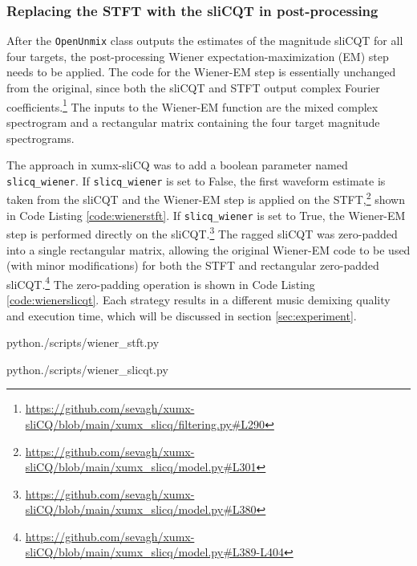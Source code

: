 \documentclass[report.tex]{subfiles}
\begin{document}
\subsubsection{Replacing the STFT with the sliCQT in post-processing}
\label{sec:replacestftwiener}

After the \Verb#OpenUnmix# class outputs the estimates of the magnitude sliCQT for all four targets, the post-processing Wiener expectation-maximization (EM) step needs to be applied. The code for the Wiener-EM step is essentially unchanged from the original, since both the sliCQT and STFT output complex Fourier coefficients.\footnote{\url{https://github.com/sevagh/xumx-sliCQ/blob/main/xumx_slicq/filtering.py\#L290}} The inputs to the Wiener-EM function are the mixed complex spectrogram and a rectangular matrix containing the four target magnitude spectrograms.

The approach in xumx-sliCQ was to add a boolean parameter named \Verb#slicq_wiener#. If \Verb#slicq_wiener# is set to False, the first waveform estimate is taken from the sliCQT and the Wiener-EM step is applied on the STFT,\footnote{\url{https://github.com/sevagh/xumx-sliCQ/blob/main/xumx_slicq/model.py\#L301}} shown in Code Listing \ref{code:wienerstft}. If \Verb#slicq_wiener# is set to True, the Wiener-EM step is performed directly on the sliCQT.\footnote{\url{https://github.com/sevagh/xumx-sliCQ/blob/main/xumx_slicq/model.py\#L380}} The ragged sliCQT was zero-padded into a single rectangular matrix, allowing the original Wiener-EM code to be used (with minor modifications) for both the STFT and rectangular zero-padded sliCQT.\footnote{\url{https://github.com/sevagh/xumx-sliCQ/blob/main/xumx_slicq/model.py\#L389-L404}} The zero-padding operation is shown in Code Listing \ref{code:wienerslicqt}. Each strategy results in a different music demixing quality and execution time, which will be discussed in section \ref{sec:experiment}. 

\begin{listing}[ht]
  \centering
\begin{inputminted}[linenos,breaklines,frame=single,fontsize=\scriptsize]{python}{./scripts/wiener_stft.py}
\end{inputminted}
  \caption{Using the STFT in the Wiener-EM post-processing step}
  \label{code:wienerstft}
\end{listing}

\begin{listing}[ht]
  \centering
\begin{inputminted}[linenos,breaklines,frame=single,fontsize=\scriptsize]{python}{./scripts/wiener_slicqt.py}
\end{inputminted}
  \caption{Zero-padding the sliCQT for the Wiener-EM post-processing step}
  \label{code:wienerslicqt}
\end{listing}
\end{document}

